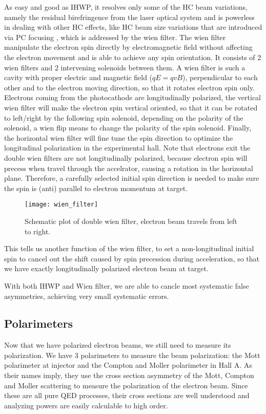 As easy and good as IHWP, it resolves only some of the HC beam variations, namely
the residual birefringence from the laser optical system and is powerless in dealing
with other HC effects, like HC beam size variations that are introduced via
PC focusing \cite{osti_1059486}, which is addressed by the wien filter.
The wien filter manipulate the electron spin directly by electromagnetic field 
without affecting the electron movement and is able to achieve any spin orientation.
It consists of 2 wien filters and 2 intervening solenoids between them.
A wien filter is such a cavity with proper electric and magnetic field ($qE = qvB$), 
perpendicular to each other and to the electron moving direction, so that it 
rotates electron spin only.
Electrons coming from the photocathode are longitudinally polarized,
the vertical wien filter will make the electron spin vertical oriented, so that
it can be rotated to left/right by the following spin solenoid, depending on
the polarity of the solenoid, a wien flip means to change the polarity of the spin solenoid.
Finally, the horizontal wien filter will fine tune the spin direction to optimize 
the longitudinal polarization in the experimental hall. Note that electrons
exit the double wien filters are not longitudinally polarized, because electron
spin will precess when travel through the accelrator, causing a rotation in the
horizontal plane. Therefore, a carefully selected initial spin direction is 
needed to make sure the spin is (anti) parallel to electron momentum at target.
\begin{figure}
    \centering
    \texttt{[image: wien\_filter]}
    \caption{Schematic plot of double wien filter, electron beam travels from left
    to right. \cite{osti_1059486}}
\end{figure}

This tells us another function of the wien filter, to set a non-longitudinal 
initial spin to cancel out the shift caused by spin precession during acceleration, 
so that we have exactly longitudinally polarized electron beam at target.

With both IHWP and Wien filter, we are able to cancle most systematic false 
asymmetries, achieving very small systematic errors.

\subsection{Polarimeters}
Now that we have polarized electron beams, we still need to measure its polarization.
We have 3 polarimeters to measure the beam polarization: the Mott polarimeter
at injector and the Compton and Moller polarimeter in Hall A. As their names
imply, they use the cross section asymmetry of the Mott, Compton and Moller
scattering to measure the polarization of the electron beam. Since these are
all pure QED processes, their cross sections are well understood and analyzing 
powers are easily calculable to high order.

